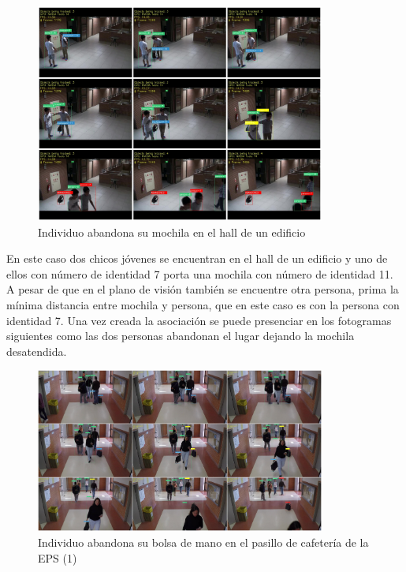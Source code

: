 \begin{figure}[ht]
\centering
\includegraphics[width=0.85\textwidth]{img/chapters/resultados/abandono/abandoned-aboda-example1.png}
\caption{\label{fig:abandoned-aboda-example1}Individuo abandona su mochila en el hall de un edificio \cite{aboda-dataset}}
\end{figure}

En este caso dos chicos jóvenes se encuentran en el hall de un edificio y uno de ellos con número de identidad 7 porta una mochila con número de identidad 11. A pesar de que en el plano de visión también se encuentre otra persona, prima la mínima distancia entre mochila y persona, que en este caso es con la persona con identidad 7. Una vez creada la asociación se puede presenciar en los fotogramas siguientes como las dos personas abandonan el lugar dejando la mochila desatendida.

\begin{figure}[ht!]
\centering
\includegraphics[width=0.85\textwidth]{img/chapters/resultados/abandono/1.png}
\caption{\label{fig:results1}Individuo abandona su bolsa de mano en el pasillo de cafetería de la EPS (1) \cite{gba-dataset}}
\end{figure}

